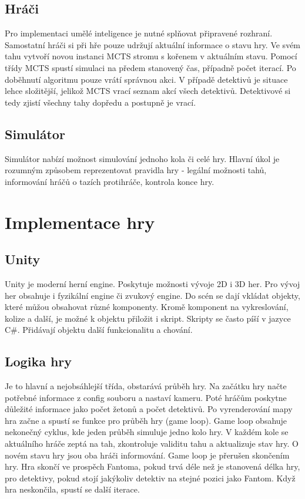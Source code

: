 \subsection{Hráči}
Pro implementaci umělé inteligence je nutné splňovat připravené rozhraní. 
Samostatní hráči si při hře pouze udržují aktuální informace o stavu hry. Ve svém tahu vytvoří novou instanci MCTS stromu s kořenem v aktuálním stavu. Pomocí třídy MCTS spustí simulaci na předem stanovený čas, případně počet iterací. Po doběhnutí algoritmu pouze vrátí správnou akci. V případě detektivů je situace lehce složitější, jelikož MCTS vrací seznam akcí všech detektivů. Detektivové si tedy zjistí všechny tahy dopředu a postupně je vrací.

\subsection{Simulátor}
Simulátor nabízí možnost simulování jednoho kola či celé hry. Hlavní úkol je rozumným způsobem reprezentovat pravidla hry - legální možnosti tahů, informování hráčů o tazích protihráče, kontrola konce hry.  

\section{Implementace hry}

\subsection{Unity}
Unity je moderní herní engine. Poskytuje možnosti vývoje 2D i 3D her. Pro vývoj her obsahuje i fyzikální engine či zvukový engine. Do scén se dají vkládat objekty, které můžou obsahovat různé komponenty. Kromě komponent na vykreslování, kolize a další, je možné k objektu přiložit i skript. Skripty se často píší v jazyce C\#. Přidávají objektu další funkcionalitu a chování. 

\subsection{Logika hry}
Je to hlavní a nejobsáhlejší třída, obstarává průběh hry. Na začátku hry načte potřebné informace z config souboru a nastaví kameru. Poté hráčům poskytne důležité informace jako počet žetonů a počet detektivů. Po vyrenderování mapy hra začne a spustí se funkce pro průběh hry (game loop). 
Game loop obsahuje nekonečný cyklus, kde jeden průběh simuluje jedno kolo hry. V každém kole se aktuálního hráče zeptá na tah, zkontroluje validitu tahu a aktualizuje stav hry. O novém stavu hry jsou oba hráči informování. Game loop je přerušen skončením hry. Hra skončí ve prospěch Fantoma, pokud trvá déle než je stanovená délka hry, pro detektivy, pokud stojí jakýkoliv detektiv na stejné pozici jako Fantom. Když hra neskončila, spustí se další iterace. 

